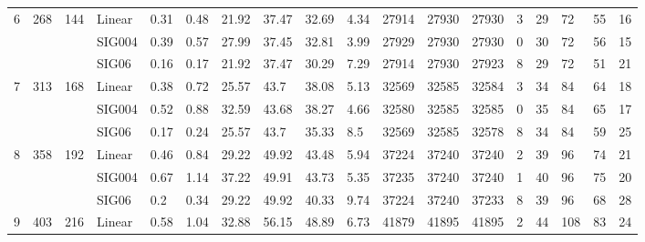 \begin{longtable}{llllllllllllllllll}
\cline{1-18} \cline{2-18} \cline{3-18}
\multirow[t]{3}{*}{6} & \multirow[t]{3}{*}{268} & \multirow[t]{3}{*}{144} & Linear & \num{0.31} & \num{0.48} & \num{21.92} & \num{37.47} & \num{32.69} & \num{4.34} & \num{27914} & \num{27930} & \num{27930} & \num{3} & \num{29} & \num{72} & \num{55} & \num{16} \\
 &  &  & SIG004 & \num{0.39} & \num{0.57} & \num{27.99} & \num{37.45} & \num{32.81} & \num{3.99} & \num{27929} & \num{27930} & \num{27930} & \num{0} & \num{30} & \num{72} & \num{56} & \num{15} \\
 &  &  & SIG06 & \num{0.16} & \num{0.17} & \num{21.92} & \num{37.47} & \num{30.29} & \num{7.29} & \num{27914} & \num{27930} & \num{27923} & \num{8} & \num{29} & \num{72} & \num{51} & \num{21} \\
\cline{1-18} \cline{2-18} \cline{3-18}
\multirow[t]{3}{*}{7} & \multirow[t]{3}{*}{313} & \multirow[t]{3}{*}{168} & Linear & \num{0.38} & \num{0.72} & \num{25.57} & \num{43.7} & \num{38.08} & \num{5.13} & \num{32569} & \num{32585} & \num{32584} & \num{3} & \num{34} & \num{84} & \num{64} & \num{18} \\
 &  &  & SIG004 & \num{0.52} & \num{0.88} & \num{32.59} & \num{43.68} & \num{38.27} & \num{4.66} & \num{32580} & \num{32585} & \num{32585} & \num{0} & \num{35} & \num{84} & \num{65} & \num{17} \\
 &  &  & SIG06 & \num{0.17} & \num{0.24} & \num{25.57} & \num{43.7} & \num{35.33} & \num{8.5} & \num{32569} & \num{32585} & \num{32578} & \num{8} & \num{34} & \num{84} & \num{59} & \num{25} \\
\cline{1-18} \cline{2-18} \cline{3-18}
\multirow[t]{3}{*}{8} & \multirow[t]{3}{*}{358} & \multirow[t]{3}{*}{192} & Linear & \num{0.46} & \num{0.84} & \num{29.22} & \num{49.92} & \num{43.48} & \num{5.94} & \num{37224} & \num{37240} & \num{37240} & \num{2} & \num{39} & \num{96} & \num{74} & \num{21} \\
 &  &  & SIG004 & \num{0.67} & \num{1.14} & \num{37.22} & \num{49.91} & \num{43.73} & \num{5.35} & \num{37235} & \num{37240} & \num{37240} & \num{1} & \num{40} & \num{96} & \num{75} & \num{20} \\
 &  &  & SIG06 & \num{0.2} & \num{0.34} & \num{29.22} & \num{49.92} & \num{40.33} & \num{9.74} & \num{37224} & \num{37240} & \num{37233} & \num{8} & \num{39} & \num{96} & \num{68} & \num{28} \\
\cline{1-18} \cline{2-18} \cline{3-18}
\multirow[t]{3}{*}{9} & \multirow[t]{3}{*}{403} & \multirow[t]{3}{*}{216} & Linear & \num{0.58} & \num{1.04} & \num{32.88} & \num{56.15} & \num{48.89} & \num{6.73} & \num{41879} & \num{41895} & \num{41895} & \num{2} & \num{44} & \num{108} & \num{83} & \num{24} \\

\end{longtable}
